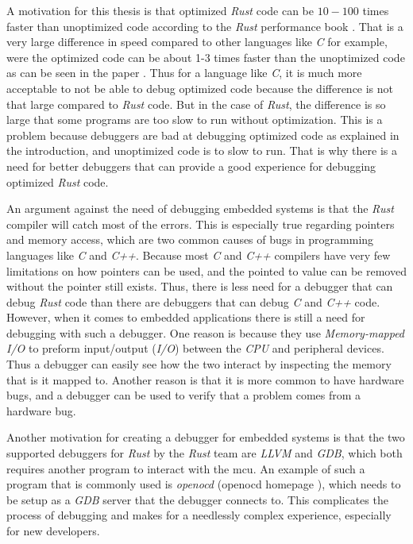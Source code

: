 A motivation for this thesis is that optimized \emph{Rust} code can be $10-100$ times faster than unoptimized code according to the \emph{Rust} performance book \cite{perf-book}.
That is a very large difference in speed compared to other languages like \emph{C} for example, were the optimized code can be about 1-3 times faster than the unoptimized code as can be seen in the paper \cite{clang-opt}.
Thus for a language like \emph{C}, it is much more acceptable to not be able to debug optimized code because the difference is not that large compared to \emph{Rust} code.
But in the case of \emph{Rust}, the difference is so large that some programs are too slow to run without optimization.
This is a problem because debuggers are bad at debugging optimized code as explained in the introduction, and unoptimized code is to slow to run.
That is why there is a need for better debuggers that can provide a good experience for debugging optimized \emph{Rust} code.


An argument against the need of debugging embedded systems is that the \emph{Rust} compiler will catch most of the errors.
This is especially true regarding pointers and memory access, which are two common causes of bugs in programming languages like \emph{C} and \emph{C++}.
Because most \emph{C} and \emph{C++} compilers have very few limitations on how pointers can be used, and the pointed to value can be removed without the pointer still exists. 
Thus, there is less need for a debugger that can debug \emph{Rust} code than there are debuggers that can debug \emph{C} and \emph{C++} code.
However, when it comes to embedded applications there is still a need for debugging with such a debugger.
One reason is because they use \emph{Memory-mapped I/O} to preform input/output (\emph{I/O}) between the \emph{CPU} and peripheral devices.
Thus a debugger can easily see how the two interact by inspecting the memory that is it mapped to.
Another reason is that it is more common to have hardware bugs, and a debugger can be used to verify that a problem comes from a hardware bug.


Another motivation for creating a debugger for embedded systems is that the two supported debuggers for \emph{Rust} by the \emph{Rust} team are \emph{LLVM} and \emph{GDB}, which both requires another program to interact with the \gls{mcu}.
An example of such a program that is commonly used is \emph{openocd} (openocd homepage \cite{openocd}), which needs to be setup as a \emph{GDB} server that the debugger connects to.
This complicates the process of debugging and makes for a needlessly complex experience, especially for new developers.


